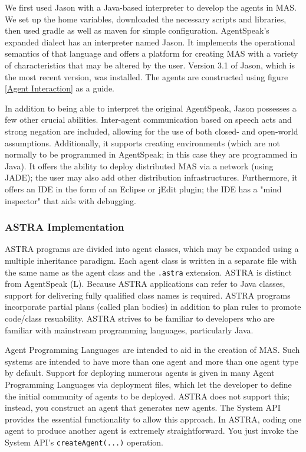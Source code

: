 We first used Jason with a Java-based interpreter to develop the agents in \ac{MAS}. We set up the home variables, downloaded the necessary scripts and libraries, then used gradle as well as maven for simple configuration. AgentSpeak's expanded dialect has an interpreter named Jason. It implements the operational semantics of that language and offers a platform for creating \ac{MAS} with a variety of characteristics that may be altered by the user. Version 3.1 of Jason, which is the most recent version, was installed. The agents are constructed using figure  \ref{Agent Interaction} as a guide.

\vspace{.5cm}

In addition to being able to interpret the original AgentSpeak, Jason possesses a few other crucial abilities. Inter-agent communication based on speech acts and strong negation are included, allowing for the use of both closed- and open-world assumptions. Additionally, it supports creating environments (which are not normally to be programmed in AgentSpeak; in this case they are programmed in Java). It offers the ability to deploy distributed \ac{MAS} via a network (using \ac{JADE}); the user may also add other distribution infrastructures. Furthermore, it offers an \ac{IDE} in the form of an Eclipse or jEdit plugin; the \ac{IDE} has a "mind inspector" that aids with debugging.

\subsubsection{ASTRA Implementation}

ASTRA programs are divided into agent classes, which may be expanded using a multiple inheritance paradigm. Each agent class is written in a separate file with the same name as the agent class and the \texttt{.astra} extension. ASTRA is distinct from AgentSpeak (L). Because ASTRA applications can refer to Java classes, support for delivering fully qualified class names is required. ASTRA programs incorporate partial plans (called plan bodies) in addition to plan rules to promote code/class resuability. ASTRA strives to be familiar to developers who are familiar with mainstream programming languages, particularly Java.

 \vspace{.5cm}
 
Agent Programming Languages are intended to aid in the creation of \ac{MAS}. Such systems are intended to have more than one agent and more than one agent type by default. Support for deploying numerous agents is given in many Agent Programming Languages via deployment files, which let the developer to define the initial community of agents to be deployed. ASTRA does not support this; instead, you construct an agent that generates new agents. The System \ac{API} provides the essential functionality to allow this approach. In ASTRA, coding one agent to produce another agent is extremely straightforward. You just invoke the System \ac{API}'s \texttt{createAgent(...)} operation.

